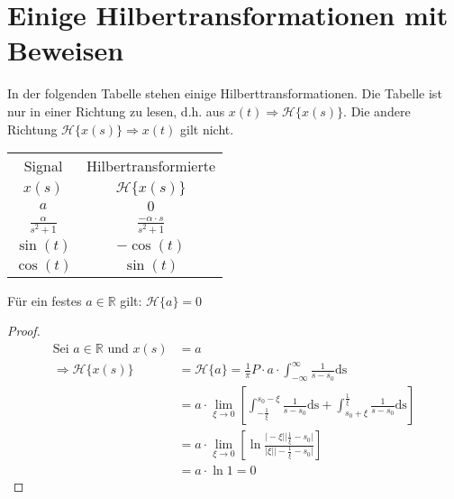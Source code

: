 \section{Einige Hilbertransformationen mit Beweisen}\label{ht:alltrans}
In der folgenden Tabelle stehen einige Hilberttransformationen. Die Tabelle ist nur in einer Richtung zu lesen, d.h. aus $x(t) \Rightarrow \mathscr{H}\{x(s)\}$. Die andere Richtung $\mathscr{H}\{x(s)\} \Rightarrow x(t)$ gilt nicht.
\begin{center}
\begin{tabular}{|c|c|}
\hline
\rule[-1ex]{0pt}{2.5ex} Signal & Hilbertransformierte \\  
\rule[-1ex]{0pt}{2.5ex} $x(s)$ & $\mathscr{H}\{x(s)\}$ \\
\hline  
\rule[-1ex]{0pt}{2.5ex} $a$ & $0$ \\
\hline
\rule[-1ex]{0pt}{2.5ex} $\frac{\alpha}{s^2+1}$ & $\frac{-\alpha \cdot s}{s^2+1}$ \\ 
\hline
\rule[-1ex]{0pt}{2.5ex} $\sin(t)$ & $-\cos(t)$ \\  
\hline
\rule[-1ex]{0pt}{2.5ex} $\cos(t)$ & $\sin(t)$ \\  
\hline 
\end{tabular} 
\end{center}
\begin{lemma}\label{ht:const}
Für ein festes $a \in \mathbb{R}$ gilt: $\mathscr{H}\{a\} = 0$
\begin{proof}
\begin{align}
\text{Sei } a \in \mathbb{R} \text{ und } x(s) &= a\\
\Rightarrow \mathscr{H}\{x(s)\} &= \mathscr{H}\{a\} = \frac{1}{\pi }P \cdot a \cdot \int_{-\infty}^{\infty} \frac{1}{s-s_0} \mathrm{ds}\\
&= a \cdot \lim_{\xi \rightarrow 0} \left \lbrack  \int_{-\frac{1}{\xi}}^{s_0-\xi} \frac{1}{s - s_0} \mathrm{ds}+ \int_{s_0+\xi}^{\frac{1}{\xi}} \frac{1}{s - s_0} \mathrm{ds}\right\rbrack \\
&= a \cdot \lim_{\xi \rightarrow 0} \left[\ln{\frac{\vert -\xi\vert\vert\frac{1}{\xi}-s_0\vert}{\vert \xi\vert\vert-\frac{1}{\xi}-s_0\vert}}\right]\\
&=a\cdot \ln{1}= 0
\end{align}
\end{proof}
\end{lemma}

